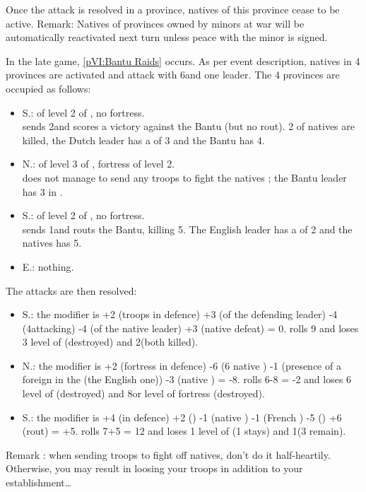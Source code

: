 \bparag Once the attack is resolved in a province, natives of this province
cease to be active.
\bparag Remark: Natives of provinces owned by \ROTW minors at war will be
automatically reactivated next turn unless peace with the minor is signed.


\begin{exemple}
  In the late game, \ref{pVI:Bantu Raids} occurs. As per event description,
  natives in 4 provinces are activated and attack with 6\LD and one
  leader. The 4 provinces are occupied as follows:
  \begin{itemize}
  \item \granderegionNyasa S.: \TP of level 2 of \HOL, no fortress.\\
    \HOL sends 2\LD and scores a victory against the Bantu (but no rout). 2\LD
    of natives are killed, the Dutch leader has a \Man of 3 and
    the Bantu has 4.
  \item \granderegionNatal N.: \TP of level 3 of \FRA, fortress of level 2.\\
    \FRA does not manage to send any troops to fight the natives ; the Bantu
    leader has 3 in \Man.
  \item \granderegionNatal S.: \TP of level 2 of \ANG, no fortress.\\
    \ANG sends 1\ARMY\Faceplus and routs the Bantu, killing 5\LD. The English
    leader has a \Man of 2 and the natives has 5.
  \item \granderegionCap E.: nothing.
  \end{itemize}
  The attacks are then resolved:
  \begin{itemize}
  \item \granderegionNyasa S.: the modifier is +2 (troops in defence) +3
    (\Man of the defending leader) -4 (4\LD attacking) -4
    (\Man of the native leader) +3 (native defeat) = 0. \HOL
    rolls 9 and loses 3 level of \TP (destroyed) and 2\LD (both killed).
  \item \granderegionNatal N.: the modifier is +2 (fortress in defence) -6 (6
    native \LD) -1 (presence of a foreign \TP in the \Area (the English one))
    -3 (native \Man) = -8. \FRA rolls 6-8 = -2 and loses 6 level
    of \TP (destroyed) and 8\LD or level of fortress (destroyed).
  \item \granderegionNatal S.: the modifier is +4 (\LD in defence) +2
    (\Man) -1 (native \LD) -1 (French \TP) -5 (\Man)
    +6 (rout) = +5. \ANG rolls 7+5 = 12 and loses 1 level of \TP (1 stays) and
    1\LD (3 remain).
  \end{itemize}
  Remark : when sending troops to fight off natives, don't do it
  half-heartily. Otherwise, you may result in loosing your troops in addition
  to your establishment\ldots
\end{exemple}

